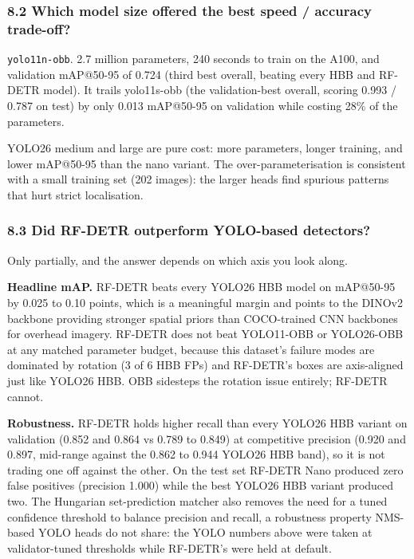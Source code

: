 \documentclass[11pt
]{article}
\begin{document}
\subsubsection{8.2 Which model size offered the best speed / accuracy
trade-off?}\label{which-model-size-offered-the-best-speed-accuracy-trade-off}

\texttt{yolo11n-obb}. 2.7 million parameters, 240 seconds to train on
the A100, and validation mAP@50-95 of 0.724 (third best overall, beating
every HBB and RF-DETR model). It trails yolo11s-obb (the validation-best
overall, scoring 0.993 / 0.787 on test) by only 0.013 mAP@50-95 on
validation while costing 28\% of the parameters.

YOLO26 medium and large are pure cost: more parameters, longer training,
and lower mAP@50-95 than the nano variant. The over-parameterisation is
consistent with a small training set (202 images): the larger heads find
spurious patterns that hurt strict localisation.

\subsubsection{8.3 Did RF-DETR outperform YOLO-based
detectors?}\label{did-rf-detr-outperform-yolo-based-detectors}

Only partially, and the answer depends on which axis you look along.

\textbf{Headline mAP.} RF-DETR beats every YOLO26 HBB model on mAP@50-95
by 0.025 to 0.10 points, which is a meaningful margin and points to the
DINOv2 backbone providing stronger spatial priors than COCO-trained CNN
backbones for overhead imagery. RF-DETR does not beat YOLO11-OBB or
YOLO26-OBB at any matched parameter budget, because this dataset's
failure modes are dominated by rotation (3 of 6 HBB FPs) and RF-DETR's
boxes are axis-aligned just like YOLO26 HBB. OBB sidesteps the rotation
issue entirely; RF-DETR cannot.

\textbf{Robustness.} RF-DETR holds higher recall than every YOLO26 HBB
variant on validation (0.852 and 0.864 vs 0.789 to 0.849) at competitive
precision (0.920 and 0.897, mid-range against the 0.862 to 0.944 YOLO26
HBB band), so it is not trading one off against the other. On the test
set RF-DETR Nano produced zero false positives (precision 1.000) while
the best YOLO26 HBB variant produced two. The Hungarian set-prediction
matcher also removes the need for a tuned confidence threshold to
balance precision and recall, a robustness property NMS-based YOLO heads
do not share: the YOLO numbers above were taken at validator-tuned
thresholds while RF-DETR's were held at default.
\end{document}
